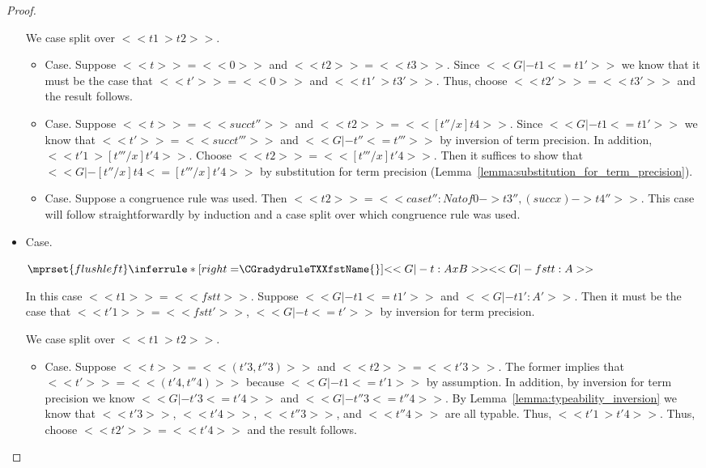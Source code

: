 \begin{proof}
\begin{itemize}
    We case split over $<<t1 ~> t2>>$.
    \begin{itemize}
    \item[] Case.  Suppose $<<t>> = <<0>>$ and $<<t2>> = <<t3>>$.  Since $<<G |- t1 <= t1'>>$ we know that
      it must be the case that $<<t'>> = <<0>>$ and $<<t1' ~> t3'>>$.  Thus, choose $<<t2'>> = <<t3'>>$ and the result follows.
      
    \item[] Case.  Suppose $<<t>> = <<succ t''>>$ and $<<t2>> = << [t''/x]t4>>$.  Since $<<G |- t1 <= t1'>>$
      we know that $<<t'>> = <<succ t'''>>$ and $<<G |- t'' <= t'''>>$ by inversion of term precision. In addition,
      $<<t'1 ~> [t'''/x]t'4>>$. Choose $<<t2>> = << [t'''/x]t'4>>$.  Then it suffices to show that
      $<<G |- [t''/x]t4 <= [t'''/x]t'4>>$ by substitution for term precision (Lemma~\ref{lemma:substitution_for_term_precision}).            
      
    \item[] Case.  Suppose a congruence rule was used.  Then $<<t2>> = <<case t'' : Nat of 0 -> t3'', (succ x) -> t4''>>$.
      This case will follow straightforwardly by induction and a case split over which congruence rule was used.
      
    \end{itemize}   

  \item[] Case.\ \\ 
    \begin{center}
      \begin{math}
        $$\mprset{flushleft}
        \inferrule* [right=$\CGradydruleTXXfstName{}$] {
          <<G |- t : A x B>>
        }{<<G |- fst t : A>>}
      \end{math}
    \end{center}
    In this case $<<t1>> = <<fst t>>$.  Suppose $<<G |- t1 <= t1'>>$ and $<<G |- t1' : A'>>$.  Then
    it must be the case that $<<t'1>> = <<fst t'>>$, $<<G |- t <= t'>>$ by inversion for term
    precision.

    We case split over $<<t1 ~> t2>>$.
    \begin{itemize}
    \item[] Case. Suppose $<<t>> = <<(t'3,t''3)>>$ and $<<t2>> = <<t'3>>$.  The former implies
      that $<<t'>> = <<(t'4,t''4)>>$ because $<<G |- t1 <= t'1>>$ by assumption.  In addition,
      by inversion for term precision we know $<<G |- t'3 <= t'4>>$ and $<<G |- t''3 <= t''4>>$.
      By Lemma~\ref{lemma:typeability_inversion} we know that $<<t'3>>$, $<<t'4>>$, $<<t''3>>$, and
      $<<t''4>>$ are all typable.  Thus, $<<t'1 ~> t'4>>$. Thus, choose
      $<<t2'>> = <<t'4>>$ and the result follows.


\end{itemize}
\end{itemize}
\end{proof}
